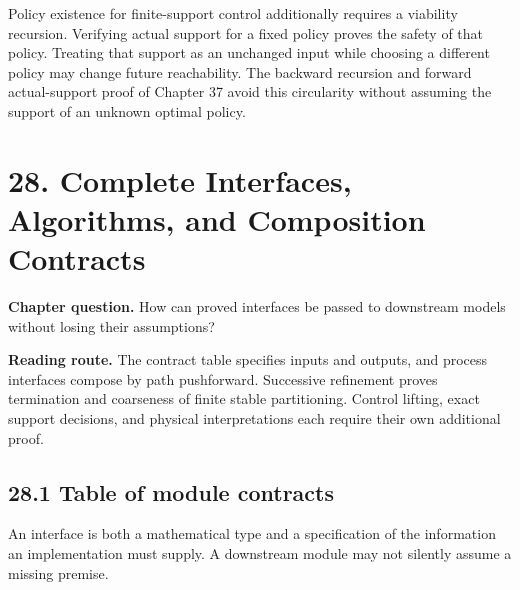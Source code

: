 \documentclass[
  english,
  11pt,
  oneside]{book}
\begin{document}
Policy existence for finite-support control additionally requires a viability recursion. Verifying actual support for a fixed policy proves the safety of that policy. Treating that support as an unchanged input while choosing a different policy may change future reachability. The backward recursion and forward actual-support proof of Chapter 37 avoid this circularity without assuming the support of an unknown optimal policy.

\chapter{28. Complete Interfaces, Algorithms, and Composition Contracts}\label{ch-28}

\textbf{Chapter question.} How can proved interfaces be passed to downstream models without losing their assumptions?

\textbf{Reading route.} The contract table specifies inputs and outputs, and process interfaces compose by path pushforward. Successive refinement proves termination and coarseness of finite stable partitioning. Control lifting, exact support decisions, and physical interpretations each require their own additional proof.

\section{28.1 Table of module contracts}\label{table-of-module-contracts}

An interface is both a mathematical type and a specification of the information an implementation must supply. A downstream module may not silently assume a missing premise.
\end{document}
